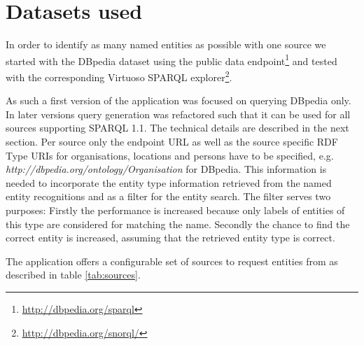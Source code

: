 \section{Datasets used} 
\label{sec:datasets}
In order to identify as many named entities as possible with one source we started with the DBpedia dataset \cite{dbpedia_dbpedia_2016}
using the public data endpoint\footnote{\url{http://dbpedia.org/sparql}} and tested with the corresponding Virtuoso \cite{openlink_software_openlink_2016} SPARQL explorer\footnote{\url{http://dbpedia.org/snorql/}}.

As such a first version of the application was focused on querying DBpedia only. In later versions query generation was refactored such that it can be used for all sources supporting SPARQL 1.1. The technical details are described in the next section. Per source only the endpoint URL as well as the source specific RDF Type URIs for organisations, locations and persons have to be specified, e.g. \textit{http://dbpedia.org/ontology/Organisation} for DBpedia. This information is needed to incorporate the entity type information retrieved from the named entity recognitions and as a filter for the entity search. The filter serves two purposes: Firstly the performance is increased because only labels of entities of this type are considered for matching the name. Secondly the chance to find the correct entity is increased, assuming that the retrieved entity type is correct.

The application offers a configurable set of sources to request entities from as described in table \ref{tab:sources}.

